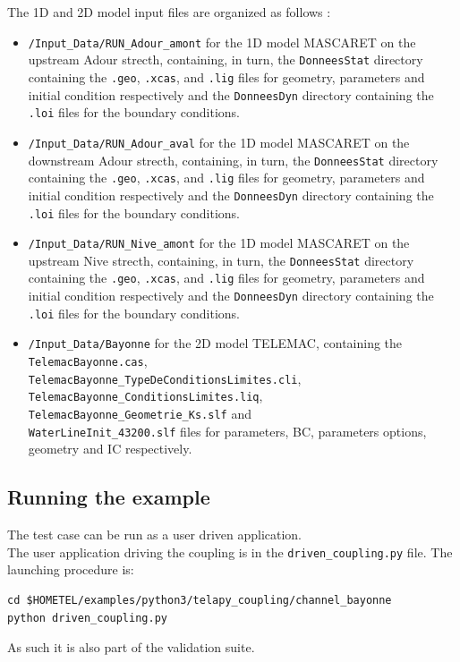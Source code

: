 \documentclass[Coupling]{../../data/TelemacDoc} %
\begin{document}
The 1D and 2D model input files are organized as follows : 
\begin{itemize}
\item \texttt{/Input\_Data/RUN\_Adour\_amont} for the 1D model
  MASCARET on the upstream Adour strecth, containing, in turn, the
  \texttt{DonneesStat} directory containing the \texttt{.geo}, \texttt{.xcas},
  and \texttt{.lig} files for geometry, parameters and initial
  condition respectively and the \texttt{DonneesDyn} directory
  containing the \texttt{.loi} files for the boundary conditions.
\item \texttt{/Input\_Data/RUN\_Adour\_aval} for the 1D model
  MASCARET on the downstream Adour strecth, containing, in turn, the
  \texttt{DonneesStat} directory containing the \texttt{.geo}, \texttt{.xcas},
  and \texttt{.lig} files for geometry, parameters and initial
  condition respectively and the \texttt{DonneesDyn} directory
  containing the \texttt{.loi} files for the boundary conditions.
\item \texttt{/Input\_Data/RUN\_Nive\_amont} for the 1D model
  MASCARET on the upstream Nive strecth, containing, in turn, the
  \texttt{DonneesStat} directory containing the \texttt{.geo}, \texttt{.xcas},
  and \texttt{.lig} files for geometry, parameters and initial
  condition respectively and the \texttt{DonneesDyn} directory
  containing the \texttt{.loi} files for the boundary conditions.
\item \texttt{/Input\_Data/Bayonne} for the 2D model TELEMAC,
  containing the \texttt{TelemacBayonne.cas},\\
  \texttt{TelemacBayonne\_TypeDeConditionsLimites.cli},\\
  \texttt{TelemacBayonne\_ConditionsLimites.liq},\\ 
  \texttt{TelemacBayonne\_Geometrie\_Ks.slf} and\\
  \texttt{WaterLineInit\_43200.slf} files for parameters, 
  BC, parameters options, geometry and IC respectively. 
\end{itemize}

\subsection{Running the example}

The test case can be run as a user
driven application.\\

The user application driving the coupling is in the
\texttt{driven\_coupling.py} file. The launching procedure is:
\begin{verbatim}
cd $HOMETEL/examples/python3/telapy_coupling/channel_bayonne
python driven_coupling.py
\end{verbatim}
As such it is also part of the validation suite.
\end{document}

